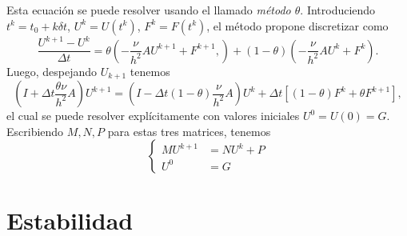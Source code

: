 \documentclass[11pt,letterpaper]{report}
\begin{document}
Esta ecuación se puede resolver usando el llamado \emph{método
$\theta$}. Introduciendo $t^{k}=t_0+k\delta t$, $U^{k}=U(t^{k})$,
$F^{k}=F(t^{k})$, el método propone discretizar como
\begin{equation}
  \frac{U^{k+1}-U^k}{\Delta t}
  =
  \theta
  \left( -\frac{\nu}{h^{2}}AU^{k+1} + F^{k+1}, \right)
  +
  (1-\theta)
  \left( -\frac{\nu}{h^{2}}AU^{k} + F^{k} \right)
.\end{equation}
Luego, despejando $U_{k+1}$ tenemos
\begin{equation}
  \left( I
    +
    \Delta t
    \frac{\theta\nu}{h^{2}}A
  \right)
  U^{k+1}
  =
    \left(
      I-
      \Delta t
      (1-\theta)
      \frac{\nu}{h^{2}}A
    \right)
    U^k
    +
    \Delta t[
    (1-\theta)
    F^{k}
    +
    \theta
    F^{k+1}]
,\end{equation}
el cual se puede resolver explícitamente con valores iniciales
$U^{0}=U(0)=G$.
Escribiendo $M,N,P$ para estas tres matrices, tenemos
\begin{equation}
  \left\{
    \begin{aligned}
      M U^{k+1} &= NU^{k} + P
      \\
      U^{0} &= G
    \end{aligned}
  \right.
\end{equation}

\section{Estabilidad}
\end{document}
